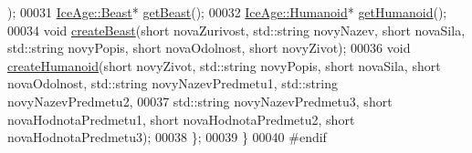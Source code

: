 \begin{DoxyCode}
      ); 
00031         \hyperlink{classIceAge_1_1Beast}{IceAge::Beast}* \hyperlink{classIceAge_1_1BuilderBytost_a0a5a5246a7b192effd4993bfcf4b23f3}{getBeast}(); 
00032         \hyperlink{classIceAge_1_1Humanoid}{IceAge::Humanoid}* \hyperlink{classIceAge_1_1BuilderBytost_a41d069e42ccad24d1af34e3e30945e25}{getHumanoid}(); 
00034         \textcolor{keywordtype}{void} \hyperlink{classIceAge_1_1BuilderBytost_a090e775261513f873b1aa85dcaca5efb}{createBeast}(\textcolor{keywordtype}{short} novaZurivost, std::string novyNazev, \textcolor{keywordtype}{short} novaSila, std::string 
      novyPopis, \textcolor{keywordtype}{short} novaOdolnost, \textcolor{keywordtype}{short} novyZivot);
00036         \textcolor{keywordtype}{void} \hyperlink{classIceAge_1_1BuilderBytost_ad0ec5281ef8ba796b945845913802b32}{createHumanoid}(\textcolor{keywordtype}{short} novyZivot, std::string novyPopis, \textcolor{keywordtype}{short} novaSila, \textcolor{keywordtype}{short} 
      novaOdolnost, std::string novyNazevPredmetu1, std::string novyNazevPredmetu2,
00037                                              std::string novyNazevPredmetu3, \textcolor{keywordtype}{short} novaHodnotaPredmetu1, \textcolor{keywordtype}{
      short} novaHodnotaPredmetu2, \textcolor{keywordtype}{short} novaHodnotaPredmetu3);
00038     \};
00039 \}
00040 \textcolor{preprocessor}{#endif}
\end{DoxyCode}
